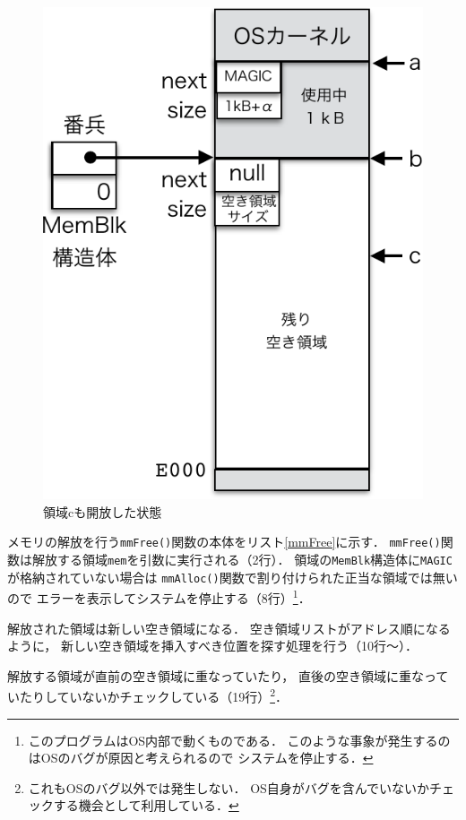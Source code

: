 \begin{figure}[btp]
\begin{center}
\begin{minipage}{0.49\columnwidth}
\includegraphics[scale=0.66]{Fig/mmFree2-crop.pdf}
\caption{領域cも開放した状態}\label{fig:mmFree2}
\end{minipage}
\end{center}
\end{figure}

メモリの解放を行う{\tt mmFree()}関数の本体をリスト\ref{mmFree}に示す．
{\tt mmFree()}関数は解放する領域{\tt mem}を引数に実行される（2行）．
領域の{\tt MemBlk}構造体に{\tt MAGIC}が格納されていない場合は
{\tt mmAlloc()}関数で割り付けられた正当な領域では無いので
エラーを表示してシステムを停止する（8行）\footnote{
このプログラムはOS内部で動くものである．
このような事象が発生するのはOSのバグが原因と考えられるので
システムを停止する．}．

解放された領域は新しい空き領域になる．
空き領域リストがアドレス順になるように，
新しい空き領域を挿入すべき位置を探す処理を行う（10行〜）．

解放する領域が直前の空き領域に重なっていたり，
直後の空き領域に重なっていたりしていないかチェックしている（19行）\footnote{
これもOSのバグ以外では発生しない．
OS自身がバグを含んでいないかチェックする機会として利用している．}．


